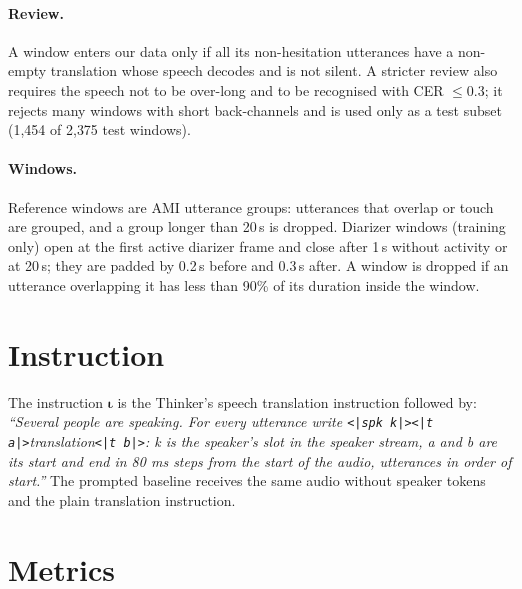 \paragraph{Review.} A window enters our data only if all its non-hesitation utterances have a non-empty translation
whose speech decodes and is not silent. A stricter review also requires the speech not to be over-long and to be
recognised with CER $\le0.3$; it rejects many windows with short back-channels and is used only as a test subset
(1{,}454 of 2{,}375 test windows).

\paragraph{Windows.} Reference windows are AMI utterance groups: utterances that overlap or touch are grouped, and a
group longer than 20\,s is dropped. Diarizer windows (training only) open at the first active diarizer frame and close
after 1\,s without activity or at 20\,s; they are padded by 0.2\,s before and 0.3\,s after. A window is dropped if an
utterance overlapping it has less than 90\% of its duration inside the window.

\section{Instruction}
\label{app:prompt}

The instruction $\bm{\iota}$ is the Thinker's speech translation instruction followed by: \emph{``Several people are
speaking. For every utterance write \texttt{<|spk k|><|t a|>}translation\texttt{<|t b|>}: k is the speaker's slot in the
speaker stream, a and b are its start and end in 80 ms steps from the start of the audio, utterances in order of
start.''} The prompted baseline receives the same audio without speaker tokens and the plain translation
instruction.

\section{Metrics}
\label{app:metrics}

